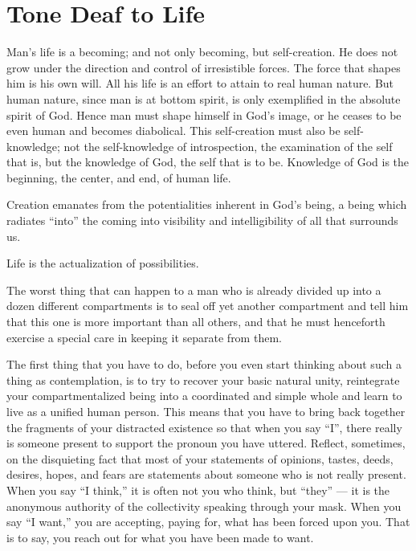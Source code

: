 \section{Tone Deaf to Life}

\begin{quotex}
Man's life is a becoming; and not only becoming, but self-creation. He does not grow under the direction and control of irresistible forces. The force that shapes him is his own will. All his life is an effort to attain to real human nature. But human nature, since man is at bottom spirit, is only exemplified in the absolute spirit of God. Hence man must shape himself in God's image, or he ceases to be even human and becomes diabolical. This self-creation must also be self-knowledge; not the self-knowledge of introspection, the examination of the self that is, but the knowledge of God, the self that is to be. Knowledge of God is the beginning, the center, and end, of human life.

Creation emanates from the potentialities inherent in God's being, a being which radiates ``into'' the coming into visibility and intelligibility of all that surrounds us.

Life is the actualization of possibilities.

The worst thing that can happen to a man who is already divided up into a dozen different compartments is to seal off yet another compartment and tell him that this one is more important than all others, and that he must henceforth exercise a special care in keeping it separate from them.

The first thing that you have to do, before you even start thinking about such a thing as contemplation, is to try to recover your basic natural unity, reintegrate your compartmentalized being into a coordinated and simple whole and learn to live as a unified human person. This means that you have to bring back together the fragments of your distracted existence so that when you say ``I'', there really is someone present to support the pronoun you have uttered. Reflect, sometimes, on the disquieting fact that most of your statements of opinions, tastes, deeds, desires, hopes, and fears are statements about someone who is not really present. When you say ``I think,'' it is often not you who think, but ``they'' --- it is the anonymous authority of the collectivity speaking through your mask. When you say ``I want,'' you are accepting, paying for, what has been forced upon you. That is to say, you reach out for what you have been made to want.
\end{quotex}


